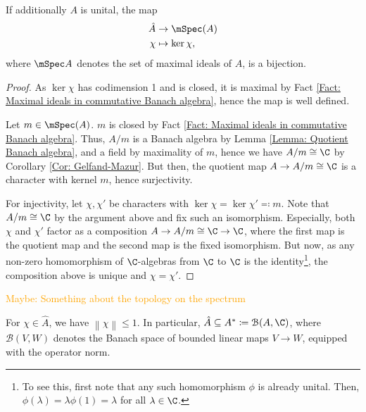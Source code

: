 \documentclass[american]{scrartcl}
\newcommand{\weaktodo}[1]{\textcolor{orange}{Maybe: #1}}
\renewcommand{\norm}[1]{\left\lVert #1 \right\rVert}
\newcommand{\cB}{\mathcal{B}}
\begin{document}
	\begin{proposition}\label{Prop: Spectrum is maximal ideals}
		If additionally $A$ is unital, the map
		\begin{align*}
			\hat{A}&\to \mSpec(A)\\
			\chi &\mapsto \ker \chi,
		\end{align*}
		where $\mSpec A$ denotes the set of maximal ideals of $A$, is a bijection.
	\end{proposition}
\begin{proof}
	As $\ker \chi$ has codimension 1 and is closed, it is maximal by Fact \ref{Fact: Maximal ideals in commutative Banach algebra}, hence the map is well defined.
	
	Let $m\in\mSpec(A)$. $m$ is closed by Fact \ref{Fact: Maximal ideals in commutative Banach algebra}. Thus, $A/m$ is a Banach algebra by Lemma \ref{Lemma: Quotient Banach algebra}, and a field by maximality of $m$, hence we have $A/m\cong \C$ by Corollary \ref{Cor: Gelfand-Mazur}. But then, the quotient map $A\to A/m\cong \C$ is a character with kernel $m$, hence surjectivity.
	
	For injectivity, let $\chi,\chi'$ be characters with $\ker \chi = \ker \chi'\eqcolon m$. Note that $A/m\cong \C$ by the argument above and fix such an isomorphism. Especially, both $\chi$ and $\chi'$ factor as a composition $A\to A/m\cong \C \to \C$, where the first map is the quotient map and the second map is the fixed isomorphism. But now, as any non-zero homomorphism of $\C$-algebras from $\C$ to $\C$ is the identity\footnote{To see this, first note that any such homomorphism $\phi$ is already unital. Then, $\phi(\lambda)=\lambda\phi(1)=\lambda$ for all $\lambda\in \C$.}, the composition above is unique and $\chi=\chi'$.
\end{proof}
\weaktodo{Something about the topology on the spectrum}
\begin{lemma}\label{Lemma: Spectrum subset of unit ball in dual space}
	For $\chi \in \hat{A}$, we have $\norm{\chi}\leq 1$. In particular, $\hat{A}\subseteq A^*\coloneqq \cB(A,\C)$, where $\cB(V,W)$ denotes the Banach space of bounded linear maps $V\to W$, equipped with the operator norm.
\end{lemma}
\end{document}
